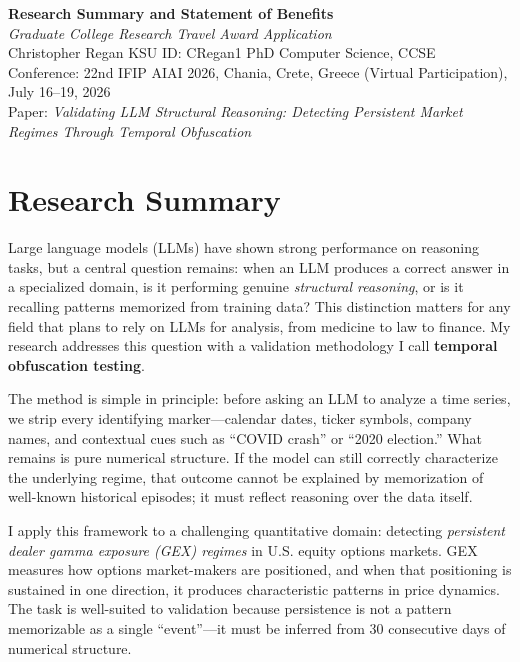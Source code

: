 \documentclass[11pt]{article}
\begin{document}
\begin{center}
{\large\bfseries Research Summary and Statement of Benefits}\\[2pt]
\textit{Graduate College Research Travel Award Application}\\[4pt]
Christopher Regan \quad\textbar\quad KSU ID: CRegan1 \quad\textbar\quad PhD Computer Science, CCSE\\
Conference: 22nd IFIP AIAI 2026, Chania, Crete, Greece (Virtual Participation), July 16--19, 2026\\
Paper: \textit{Validating LLM Structural Reasoning: Detecting Persistent Market Regimes Through Temporal Obfuscation}
\end{center}

\section*{Research Summary}

Large language models (LLMs) have shown strong performance on reasoning tasks, but a central question remains: when an LLM produces a correct answer in a specialized domain, is it performing genuine \emph{structural reasoning}, or is it recalling patterns memorized from training data? This distinction matters for any field that plans to rely on LLMs for analysis, from medicine to law to finance. My research addresses this question with a validation methodology I call \textbf{temporal obfuscation testing}.

The method is simple in principle: before asking an LLM to analyze a time series, we strip every identifying marker---calendar dates, ticker symbols, company names, and contextual cues such as ``COVID crash'' or ``2020 election.'' What remains is pure numerical structure. If the model can still correctly characterize the underlying regime, that outcome cannot be explained by memorization of well-known historical episodes; it must reflect reasoning over the data itself.

I apply this framework to a challenging quantitative domain: detecting \emph{persistent dealer gamma exposure (GEX) regimes} in U.S. equity options markets. GEX measures how options market-makers are positioned, and when that positioning is sustained in one direction, it produces characteristic patterns in price dynamics. The task is well-suited to validation because persistence is not a pattern memorizable as a single ``event''---it must be inferred from 30 consecutive days of numerical structure.
\end{document}

